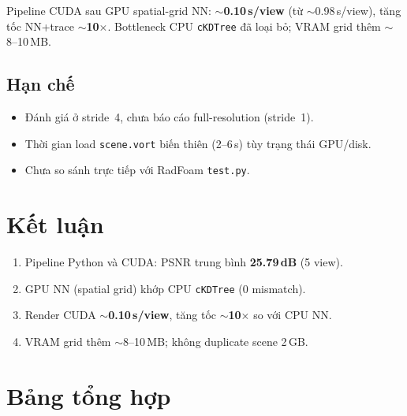 \documentclass[11pt,a4paper]{article}
\begin{document}
Pipeline CUDA sau GPU spatial-grid NN: \textbf{$\sim$0.10\,s/view} (từ $\sim$0.98\,s/view), tăng tốc NN+trace \textbf{$\sim$10$\times$}. Bottleneck CPU \texttt{cKDTree} đã loại bỏ; VRAM grid thêm $\sim$8--10\,MB.

\subsection{Hạn chế}

\begin{itemize}[noitemsep]
    \item Đánh giá ở stride~4, chưa báo cáo full-resolution (stride~1).
    \item Thời gian load \texttt{scene.vort} biến thiên (2--6\,s) tùy trạng thái GPU/disk.
    \item Chưa so sánh trực tiếp với RadFoam \texttt{test.py}.
\end{itemize}

\section{Kết luận}

\begin{enumerate}[noitemsep]
    \item Pipeline Python và CUDA: PSNR trung bình \textbf{25.79\,dB} (5 view).
    \item GPU NN (spatial grid) khớp CPU \texttt{cKDTree} (0 mismatch).
    \item Render CUDA \textbf{$\sim$0.10\,s/view}, tăng tốc \textbf{$\sim$10$\times$} so với CPU NN.
    \item VRAM grid thêm $\sim$8--10\,MB; không duplicate scene 2\,GB.
\end{enumerate}

\appendix
\section{Bảng tổng hợp}
\end{document}
